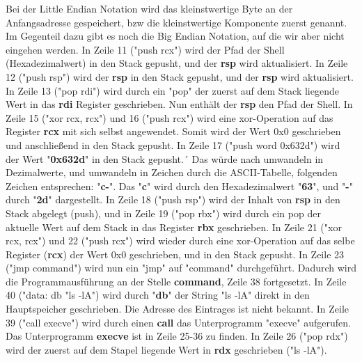 \documentclass[12pt]{article}
\begin{document}
Bei der Little Endian Notation wird das kleinstwertige Byte an der Anfangsadresse gespeichert, bzw die kleinstwertige Komponente zuerst genannt. Im Gegenteil dazu gibt es noch die Big Endian Notation, auf die wir aber nicht eingehen werden.\newline
\newline
In Zeile 11 ("push rcx") wird der Pfad der Shell (Hexadezimalwert) in den Stack gepusht, und der \textbf{rsp} wird aktualisiert.\newline
In Zeile 12 ("push rsp")  wird der \textbf{rsp} in den Stack gepusht, und der \textbf{rsp} wird aktualisiert.\newline
In Zeile 13 ("pop rdi") wird durch ein "pop" der zuerst auf dem Stack liegende Wert in das \textbf{rdi} Register geschrieben. Nun enthält der \textbf{rsp} den Pfad der Shell. \newline
In Zeile 15 ("xor rcx, rcx") und 16 ("push rcx") wird eine xor-Operation auf das Register \textbf{rcx} mit sich selbst angewendet. Somit wird der Wert 0x0 geschrieben und anschließend in den Stack gepusht. \newline
In Zeile 17 ("push word 0x632d") wird der Wert "\textbf{0x632d}" in den Stack gepusht.´
\newpage
Das würde nach umwandeln in Dezimalwerte, und umwandeln in Zeichen durch die ASCII-Tabelle, folgenden Zeichen entsprechen: "\textbf{c-}". \newline
Das "\textbf{c}" wird durch den Hexadezimalwert "\textbf{63}", und "\textbf{-}" durch "\textbf{2d}" dargestellt. \newline
In Zeile 18 ("push rsp") wird der Inhalt von \textbf{rsp} in den Stack abgelegt (push), und in Zeile 19 ("pop rbx") wird durch ein pop der aktuelle Wert auf dem Stack in das Register \textbf{rbx} geschrieben. \newline
In Zeile 21 ("xor rcx, rcx") und 22 ("push rcx") wird wieder durch eine xor-Operation auf das selbe Register (\textbf{rcx}) der Wert 0x0 geschrieben, und in den Stack gepusht.
In Zeile 23 ("jmp command") wird nun ein "jmp" auf "command" durchgeführt. Dadurch wird die Programmausführung an der Stelle \textbf{command}, Zeile 38 fortgesetzt.\newline
In Zeile 40 ("data: db "ls -lA") wird durch "\textbf{db}" der String "ls -lA" direkt in den Hauptspeicher geschrieben. Die Adresse des Eintrages ist nicht bekannt.
In Zeile 39 ("call execve") wird durch einen \textbf{call} das Unterprogramm "execve" aufgerufen. Das Unterprogramm \textbf{execve} ist in Zeile 25-36 zu finden.
In Zeile 26 ("pop rdx") wird der zuerst auf dem Stapel liegende Wert in \textbf{rdx} geschrieben ("ls -lA").
\end{document}
